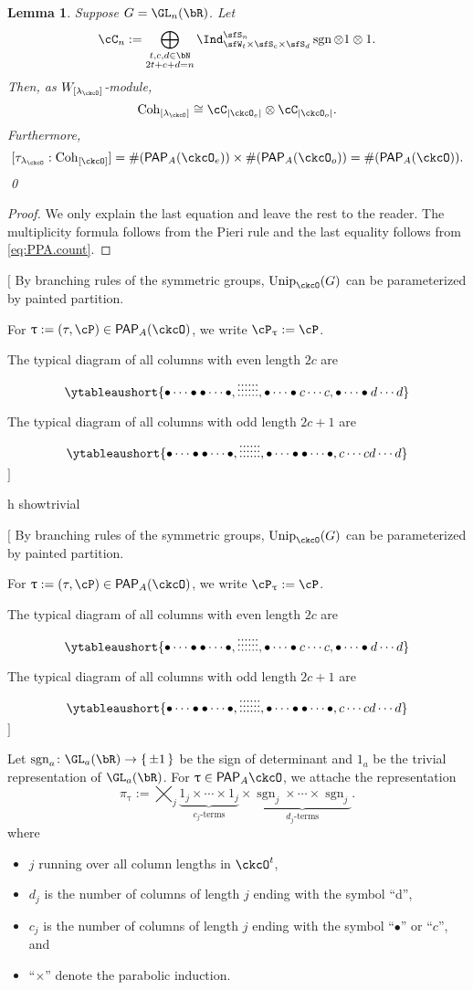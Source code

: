 \documentclass[12pt,a4paper]{amsart}
\let\ytb=\ytableaushort
\newcommand{\trivial}[2][]{\if\relax\detokenize{#1}\relax
  {%
      \color{orange} \vspace{0em} $[$  #2 $]$
      \color{black}
  }
  \else
\ifx#1h
\ifcsname showtrivial\endcsname
{%
    \color{orange} \vspace{0em}  $[$ #2 $]$
    \color{black}
}
\fi
\else {\red Wrong argument!} \fi
\fi
}
\def\abs#1{\left|{#1}\right|}
\newcommand{\sgn}{\operatorname{sgn}}
\numberwithin{equation}{section}
\newtheorem{lem}[thm]{Lemma}
\theoremstyle{remark}
\def\Unip{\mathrm{Unip}}
\def\lamck{\lambda_\ckcO}
\def\Wint#1{W_{[#1]}}
\def\Cint#1{\Coh_{[#1]}}
\def\PP{\mathsf{PAP}}
\def\Coh{\mathrm{Coh}}
\begin{document}
\begin{lem} \label{lem:GL.count}
  Suppose $G = \GL_{n}(\bR)$. Let
  \[
    \cC_n := \bigoplus_{\substack{t,c,d\in \bN \\2t+c+d=n}} \Ind_{\sfW_t\times \sfS_c\times \sfS_d}^{\sfS_{n}} \sgn \otimes 1\otimes 1.
  \]
  Then, as $W_{[\lamck]}$-module,
  \[
    \Cint{\lamck} \cong \cC_{\abs{\ckcO_{e}}}\otimes \cC_{\abs{\ckcO_{o}}}.
  \]
  Furthermore,
  \begin{equation}\label{eq:A.count}
    [\tau_{\lamck}: \Cint{\ckcO}] = \# (\PP_{A}(\ckcO_{e}))\times
    \# (\PP_{A}(\ckcO_{o})) = \# (\PP_{A}(\ckcO)).
  \end{equation}
  \qed
\end{lem}
\begin{proof}
  We only explain the last equation and leave the rest to the reader.
  The multiplicity formula follows from the Pieri rule and the last equality
  follows from \eqref{eq:PPA.count}.
\end{proof}

\trivial[]{
By branching rules of the symmetric groups, $\Unip_{\ckcO}(G)$ can be
parameterized by painted partition.

For $\uptau:=(\tau,\cP)\in \PP_{A}(\ckcO)$, we write $\cP_{\uptau}:= \cP$.

  The typical diagram of all columns with even length $2c$ are
  \[
    \ytb{\bullet\cdots\bullet\bullet\cdots\bullet,\vdots\vdots\vdots\vdots\vdots\vdots, \bullet\cdots\bullet c\cdots c, \bullet\cdots\bullet d\cdots d }
  \]

  The typical diagram of all columns with odd length $2c+1$ are
  \[
    \ytb{\bullet\cdots\bullet\bullet\cdots\bullet,\vdots\vdots\vdots\vdots\vdots\vdots, \bullet\cdots\bullet \bullet\cdots\bullet , c\cdots c d\cdots d }
  \]
}

Let $\sgn_a\colon \GL_a(\bR)\rightarrow \set{\pm 1}$ be the sign of determinant
and $1_a$ be the trivial representation of $\GL_a(\bR)$.
For
$\uptau\in \PP_{A}{\ckcO}$, we attache the representation
\begin{equation}\label{eq:u.GLR}
  \pi_\uptau :=
  \bigtimes_{j} \underbrace{1_j \times \cdots \times 1_j}_{c_j\text{-terms}}\times
  \underbrace{\sgn_j \times \cdots \times {\sgn_j} }_{d_j\text{-terms}}.
\end{equation}
where
\begin{itemize}
  \item $j$ running over all column lengths in $\ckcO^t$,
  \item $d_j$ is the number of columns of length $j$ ending with the symbol
        ``d'',
  \item $c_j$ is the number of columns of length $j$ ending with the symbol
        ``$\bullet$'' or ``$c$'', and
  \item ``$\times$'' denote the parabolic induction.
\end{itemize}
\end{document}
